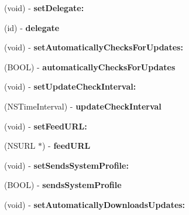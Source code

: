 \begin{DoxyCompactItemize}
(void) -\/ {\bfseries set\+Delegate\+:}
\item 
\mbox{\label{interface_s_u_updater_a116a99749681ee2120eaa7abd5d94467}} 
(id) -\/ {\bfseries delegate}
\item 
\mbox{\label{interface_s_u_updater_a4f5761c4bd9357e920c89dd249246f4e}} 
(void) -\/ {\bfseries set\+Automatically\+Checks\+For\+Updates\+:}
\item 
\mbox{\label{interface_s_u_updater_a4bd04a9a76a7843e302cd5439f1a4214}} 
(B\+O\+OL) -\/ {\bfseries automatically\+Checks\+For\+Updates}
\item 
\mbox{\label{interface_s_u_updater_a6ec815c3716bdd1e7d9f611497070765}} 
(void) -\/ {\bfseries set\+Update\+Check\+Interval\+:}
\item 
\mbox{\label{interface_s_u_updater_a6ea74060ff35e0af22350dc8bba0d47b}} 
(N\+S\+Time\+Interval) -\/ {\bfseries update\+Check\+Interval}
\item 
\mbox{\label{interface_s_u_updater_aebf52689edbf7d167facb4bdf7ec4945}} 
(void) -\/ {\bfseries set\+Feed\+U\+R\+L\+:}
\item 
\mbox{\label{interface_s_u_updater_ae6c1445bd69ebb04874f7bef86a869f7}} 
(N\+S\+U\+RL $\ast$) -\/ {\bfseries feed\+U\+RL}
\item 
\mbox{\label{interface_s_u_updater_a0172c3a00dd9f4d1bea7e565f4a0677d}} 
(void) -\/ {\bfseries set\+Sends\+System\+Profile\+:}
\item 
\mbox{\label{interface_s_u_updater_a993b24444f00a8834600cf0ccdc6fca0}} 
(B\+O\+OL) -\/ {\bfseries sends\+System\+Profile}
\item 
\mbox{\label{interface_s_u_updater_afbe0599644f4d64e807728b3863116b7}} 
(void) -\/ {\bfseries set\+Automatically\+Downloads\+Updates\+:}
\item 
\mbox{\label{interface_s_u_updater_a40b5d37d68f0607ae602c75aa171ead9}} 

\end{DoxyCompactItemize}
